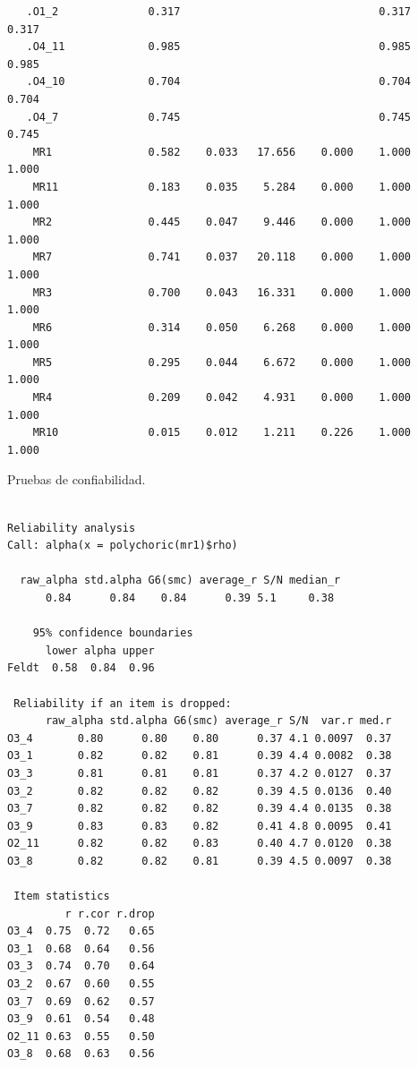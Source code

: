 \documentclass[
  letterpaper,
  DIV=11,
  numbers=noendperiod]{scrartcl}
\newenvironment{Shaded}{\begin{snugshade}}{\end{snugshade}}
\newcommand{\FunctionTok}[1]{\textcolor[rgb]{0.28,0.35,0.67}{#1}}
\newcommand{\NormalTok}[1]{\textcolor[rgb]{0.00,0.23,0.31}{#1}}
\newcommand{\OtherTok}[1]{\textcolor[rgb]{0.00,0.23,0.31}{#1}}
\newcommand{\SpecialCharTok}[1]{\textcolor[rgb]{0.37,0.37,0.37}{#1}}
\begin{document}
\begin{verbatim}
   .O1_2              0.317                               0.317    0.317
   .O4_11             0.985                               0.985    0.985
   .O4_10             0.704                               0.704    0.704
   .O4_7              0.745                               0.745    0.745
    MR1               0.582    0.033   17.656    0.000    1.000    1.000
    MR11              0.183    0.035    5.284    0.000    1.000    1.000
    MR2               0.445    0.047    9.446    0.000    1.000    1.000
    MR7               0.741    0.037   20.118    0.000    1.000    1.000
    MR3               0.700    0.043   16.331    0.000    1.000    1.000
    MR6               0.314    0.050    6.268    0.000    1.000    1.000
    MR5               0.295    0.044    6.672    0.000    1.000    1.000
    MR4               0.209    0.042    4.931    0.000    1.000    1.000
    MR10              0.015    0.012    1.211    0.226    1.000    1.000
\end{verbatim}

Pruebas de confiabilidad.

\begin{Shaded}
\end{Shaded}

\begin{verbatim}

Reliability analysis   
Call: alpha(x = polychoric(mr1)$rho)

  raw_alpha std.alpha G6(smc) average_r S/N median_r
      0.84      0.84    0.84      0.39 5.1     0.38

    95% confidence boundaries 
      lower alpha upper
Feldt  0.58  0.84  0.96

 Reliability if an item is dropped:
      raw_alpha std.alpha G6(smc) average_r S/N  var.r med.r
O3_4       0.80      0.80    0.80      0.37 4.1 0.0097  0.37
O3_1       0.82      0.82    0.81      0.39 4.4 0.0082  0.38
O3_3       0.81      0.81    0.81      0.37 4.2 0.0127  0.37
O3_2       0.82      0.82    0.82      0.39 4.5 0.0136  0.40
O3_7       0.82      0.82    0.82      0.39 4.4 0.0135  0.38
O3_9       0.83      0.83    0.82      0.41 4.8 0.0095  0.41
O2_11      0.82      0.82    0.83      0.40 4.7 0.0120  0.38
O3_8       0.82      0.82    0.81      0.39 4.5 0.0097  0.38

 Item statistics 
         r r.cor r.drop
O3_4  0.75  0.72   0.65
O3_1  0.68  0.64   0.56
O3_3  0.74  0.70   0.64
O3_2  0.67  0.60   0.55
O3_7  0.69  0.62   0.57
O3_9  0.61  0.54   0.48
O2_11 0.63  0.55   0.50
O3_8  0.68  0.63   0.56
\end{verbatim}
\end{document}
